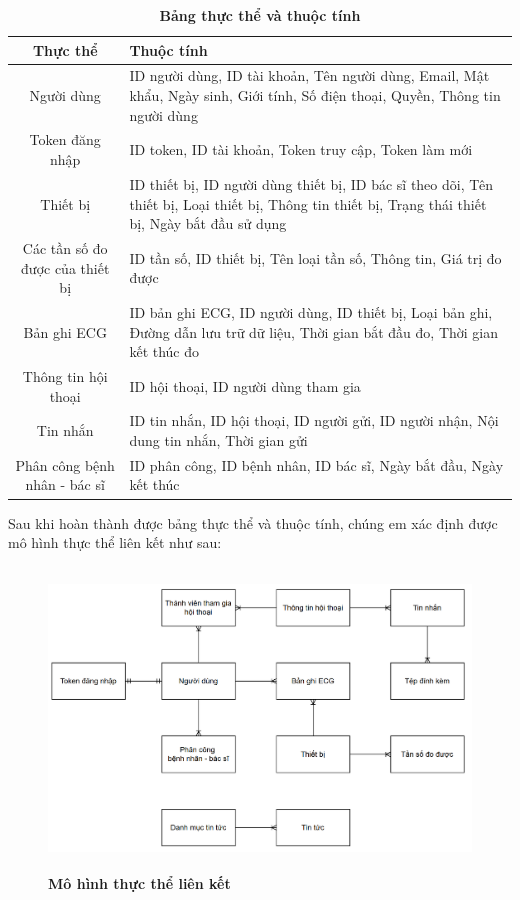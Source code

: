 \begin{table}[H]
  \caption{\bfseries \fontsize{12pt}{0pt}\selectfont Bảng thực thể và thuộc tính}
  \centering
  \begin{tabularx}{0.9\textwidth}{|c|X|}
    \hline
    \textbf{Thực thể} & \textbf{Thuộc tính} \\
    \hline
    Người dùng & 
    ID người dùng, ID tài khoản, Tên người dùng, Email, Mật khẩu, Ngày sinh, Giới tính, Số điện thoại, Quyền, Thông tin người dùng \\
    \hline
    Token đăng nhập &
    ID token, ID tài khoản, Token truy cập, Token làm mới \\
    \hline
    Thiết bị & 
    ID thiết bị, ID người dùng thiết bị, ID bác sĩ theo dõi, Tên thiết bị, Loại thiết bị, Thông tin thiết bị, Trạng thái thiết bị, Ngày bắt đầu sử dụng\\
    \hline
    Các tần số đo được của thiết bị &
    ID tần số, ID thiết bị, Tên loại tần số, Thông tin, Giá trị đo được \\
    \hline
    Bản ghi ECG & 
    ID bản ghi ECG, ID người dùng, ID thiết bị, Loại bản ghi, Đường dẫn lưu trữ dữ liệu, Thời gian bắt đầu đo, Thời gian kết thúc đo \\
    \hline
    Thông tin hội thoại &
    ID hội thoại, ID người dùng tham gia \\
    \hline
    Tin nhắn & 
    ID tin nhắn, ID hội thoại, ID người gửi, ID người nhận, Nội dung tin nhắn, Thời gian gửi \\
    \hline
    Phân công bệnh nhân - bác sĩ & 
    ID phân công, ID bệnh nhân, ID bác sĩ, Ngày bắt đầu, Ngày kết thúc \\
    \hline
  \end{tabularx}

  
\end{table}
Sau khi hoàn thành được bảng thực thể và thuộc tính, chúng em xác định được mô hình thực thể liên kết như sau:

\begin{figure}[H]
  \centering
  \includegraphics[width=15cm,height=8cm]{Images/system/fmECG_connection_entity.png}
  \caption[Mô hình thực thể liên kết]{\bfseries \fontsize{12pt}{0pt}
  \selectfont Mô hình thực thể liên kết}
  \label{ttlk} %
\end{figure}

